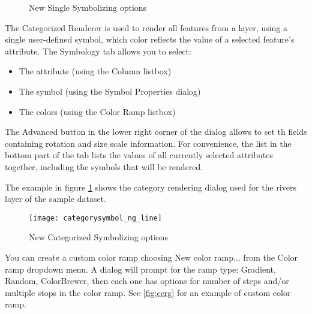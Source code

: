 \begin{figure}[ht]
\centering
   \hspace{1cm}
   \hspace{1cm}
\caption{New Single Symbolizing options \nixcaption}
\end{figure}


The Categorized Renderer is used to render all features from a layer, using a
single user-defined symbol, which color reflects the value of a selected
feature's attribute. The Symbology tab allows you to select:

\begin{itemize}[label=--]
\item The attribute (using the Column listbox)
\item The symbol (using the Symbol Properties dialog)
\item The colors (using the Color Ramp listbox)
\end{itemize}

The Advanced button in the lower right corner of the dialog allows to set
th fields containing rotation and size scale information.
For convenience, the list in the bottom part of the tab lists the values of
all currently selected attributes together, including the symbols that will
be rendered.

The example in figure \ref{fig:catsymNG} shows the category rendering dialog
used for the rivers layer of the \qg sample dataset.

\begin{figure}[ht]
   \centering
   \caption{New Categorized Symbolizing options \nixcaption}\label{fig:catsymNG}
   \texttt{[image: categorysymbol\_ng\_line]}
\end{figure}

You can create a custom color ramp choosing New color ramp... from the Color 
ramp dropdown menu. A dialog will prompt for the ramp type: Gradient, Random,
ColorBrewer, then each one has options for number of steps and/or multiple
stops in the color ramp. See \ref{fig:ccrg} for an example of custom color
ramp.

